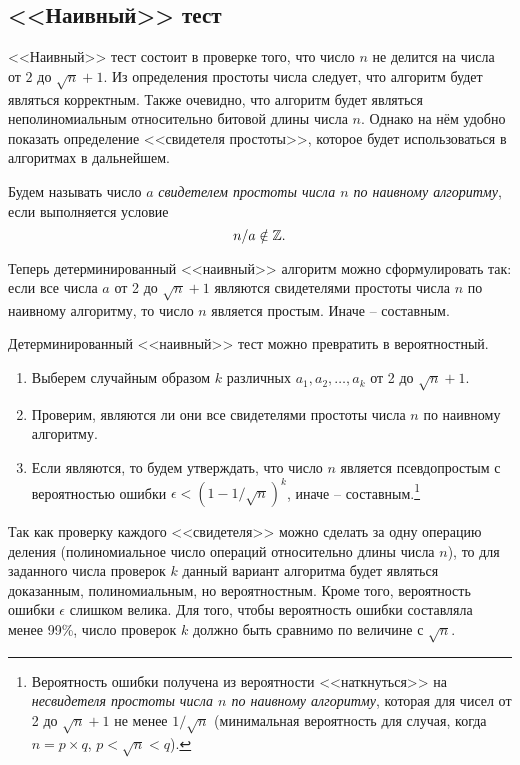 \subsection{<<Наивный>> тест}\label{section-prime-check-naive}

<<Наивный>> тест состоит в проверке того, что число $n$ не делится на числа от $2$ до $\sqrt{n}+1$. Из определения простоты числа следует, что алгоритм будет являться корректным. Также очевидно, что алгоритм будет являться неполиномиальным относительно битовой длины числа $n$. Однако на нём удобно показать определение <<свидетеля простоты>>, которое будет использоваться в алгоритмах в дальнейшем.

Будем называть число $a$ \emph{свидетелем простоты числа $n$ по наивному алгоритму}, если выполняется условие
\[
	n / a \notin \mathbb{Z}.
\]

Теперь детерминированный <<наивный>> алгоритм можно сформулировать так: если все числа $a$ от 2 до $\sqrt{n}+1$ являются свидетелями простоты числа $n$ по наивному алгоритму, то число $n$ является простым. Иначе – составным.

Детерминированный <<наивный>> тест можно превратить в вероятностный.

\begin{enumerate}
	\item Выберем случайным образом $k$ различных $a_1, a_2, \dots, a_k$ от 2 до $\sqrt{n}+1$.
	\item Проверим, являются ли они все свидетелями простоты числа $n$ по наивному алгоритму. 
	\item Если являются, то будем утверждать, что число $n$ является псевдопростым с вероятностью ошибки $\epsilon < \left( 1 - 1 / \sqrt{n} \right)^k$, иначе – составным.\footnote{Вероятность ошибки получена из вероятности <<наткнуться>> на \emph{несвидетеля простоты числа $n$ по наивному алгоритму}, которая для чисел от 2 до $\sqrt{n}+1$ не менее $1 / \sqrt{n}$ (минимальная вероятность для случая, когда $n = p \times q$, $p < \sqrt{n} < q$).}
\end{enumerate}

Так как проверку каждого <<свидетеля>> можно сделать за одну операцию деления (полиномиальное число операций относительно длины числа $n$), то для заданного числа проверок $k$ данный вариант алгоритма будет являться доказанным, полиномиальным, но вероятностным. Кроме того, вероятность ошибки $\epsilon$ слишком велика. Для того, чтобы вероятность ошибки составляла менее 99\%, число проверок $k$ должно быть сравнимо по величине с $\sqrt{n}$.
